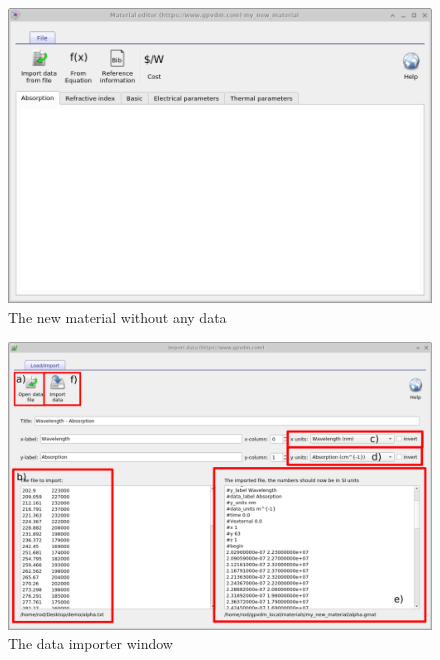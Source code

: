\begin{figure}[H]
\centering
\includegraphics[height=0.6\textwidth]{./images/database_window.png}
\caption{The new material without any data}
\label{fig:materialadd5}
\end{figure}

\begin{figure}[H]
\centering
\includegraphics[height=0.7\textwidth]{./images/database_import_window.png}
\caption{The data importer window}
\label{fig:materialadd6}
\end{figure}



